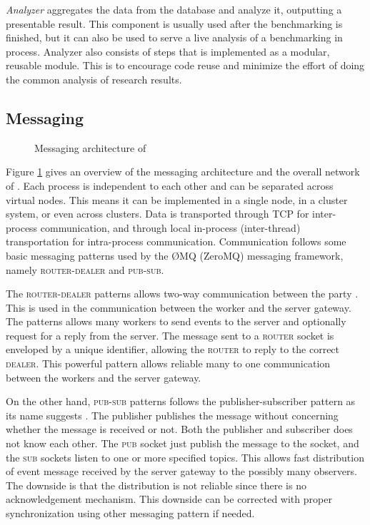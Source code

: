 \emph{Analyzer} aggregates the data from the database and analyze it, outputting a presentable result.
This component is usually used after the benchmarking is finished, but it can also be used to serve a live analysis of a benchmarking in process.
Analyzer also consists of steps that is implemented as a modular, reusable module.
This is to encourage code reuse and minimize the effort of doing the common analysis of research results.


\subsection{Messaging}
\label{sec:impl.messaging}

\begin{figure}
    \caption{Messaging architecture of \OurBenchmarkingTool}
    \label{fig:zmq}
\end{figure}

Figure \ref{fig:zmq} gives an overview of the messaging architecture and the overall network of \OurBenchmarkingTool.
Each process is independent to each other and can be separated across virtual nodes.
This means it can be implemented in a single node, in a cluster system, or even across clusters.
Data is transported through TCP for inter-process communication, and through local in-process (inter-thread) transportation for intra-process communication.
Communication follows some basic messaging patterns used by the \O MQ (ZeroMQ) messaging framework, namely \textsc{router-dealer} and \textsc{pub-sub}.

The \textsc{router-dealer} patterns allows two-way communication between the party \citep{hintjens2013zeromq}.
This is used in the communication between the worker and the server gateway.
The patterns allows many workers to send events to the server and optionally request for a reply from the server.
The message sent to a \textsc{router} socket is enveloped by a unique identifier, allowing the \textsc{router} to reply to the correct \textsc{dealer}.
This powerful pattern allows reliable many to one communication between the workers and the server gateway.

On the other hand, \textsc{pub-sub} patterns follows the publisher-subscriber pattern as its name suggests \citep{hintjens2013zeromq}.
The publisher publishes the message without concerning whether the message is received or not.
Both the publisher and subscriber does not know each other.
The \textsc{pub} socket just publish the message to the socket, and the \textsc{sub} sockets listen to one or more specified topics.
This allows fast distribution of event message received by the server gateway to the possibly many observers.
The downside is that the distribution is not reliable since there is no acknowledgement mechanism.
This downside can be corrected with proper synchronization using other messaging pattern if needed.



